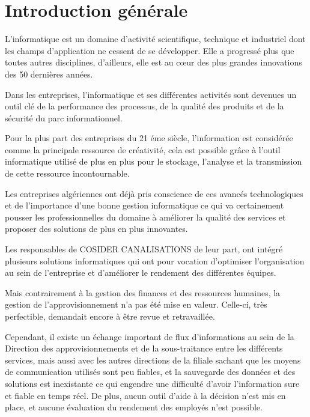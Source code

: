 \documentclass{report}
\begin{document}
\chapter*{Introduction générale}
L’informatique est un domaine d'activité scientifique, technique et industriel dont les champs d'application ne cessent de se développer.
Elle a progressé plus que toutes autres disciplines, d’ailleurs, elle est au cœur des plus grandes innovations des 50 dernières années.

Dans les entreprises, l’informatique et ses différentes activités sont devenues un outil clé de la performance des processus, de la qualité des produits et de la sécurité du parc informationnel.

Pour la plus part des entreprises du 21 éme siècle, l'information est considérée comme la principale ressource de créativité, cela est possible grâce à l'outil informatique utilisé de plus en plus pour le stockage, l'analyse et la transmission de cette ressource incontournable.

Les entreprises algériennes ont déjà pris conscience de ces avancés technologiques et de l'importance d'une bonne gestion informatique ce qui va certainement pousser les professionnelles du domaine à améliorer la qualité des services et proposer des solutions de plus en plus innovantes.

Les responsables de COSIDER CANALISATIONS de leur part, ont intégré plusieurs solutions informatiques qui ont pour vocation d’optimiser l’organisation au sein de l’entreprise et d’améliorer le rendement des différentes équipes.

Mais contrairement à la gestion des finances et des ressources humaines, la gestion de l’approvisionnement n'a pas été mise en valeur. Celle-ci, très perfectible, demandait encore à être revue et retravaillée.

Cependant, il existe un échange important de flux d'informations au sein de la Direction des approvisionnements et de la sous-traitance entre les différents services, mais aussi avec les autres directions de la filiale sachant que les moyens de communication utilisés sont peu fiables, et la sauvegarde des données et des solutions est inexistante ce qui engendre une difficulté d’avoir l’information sure et fiable en temps réel. De plus, aucun outil d'aide à la décision n'est mis en place, et aucune évaluation du rendement des employés n'est possible.
\end{document}
